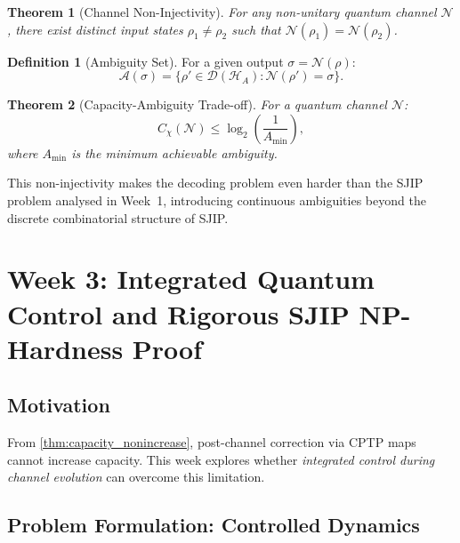 \documentclass[12pt,a4paper]{article}
\theoremstyle{definition}
\newtheorem{definition}{Definition}[section]
\theoremstyle{plain}
\newtheorem{theorem}{Theorem}[section]
\begin{document}
\begin{theorem}[Channel Non-Injectivity]
For any non-unitary quantum channel $\mathcal{N}$, there exist distinct input states
$\rho_1\ne\rho_2$ such that $\mathcal{N}(\rho_1)=\mathcal{N}(\rho_2)$.
\end{theorem}

\begin{definition}[Ambiguity Set]
For a given output $\sigma=\mathcal{N}(\rho)$:
\begin{equation}
\mathcal{A}(\sigma)=\{\rho'\in\mathcal{D}(\mathcal{H}_A):\mathcal{N}(\rho')=\sigma\}.
\end{equation}
\end{definition}

\begin{theorem}[Capacity-Ambiguity Trade-off]
\label{thm:cap_ambiguity}
For a quantum channel $\mathcal{N}$:
\begin{equation}
C_\chi(\mathcal{N})\le\log_2\!\left(\frac{1}{A_{\min}}\right),
\end{equation}
where $A_{\min}$ is the minimum achievable ambiguity.
\end{theorem}

This non-injectivity makes the decoding problem even harder than the SJIP problem
analysed in Week~1, introducing continuous ambiguities beyond the discrete combinatorial
structure of SJIP.

\section{Week 3: Integrated Quantum Control and Rigorous SJIP NP-Hardness Proof}

\subsection{Motivation}

From \cref{thm:capacity_nonincrease}, post-channel correction via CPTP maps cannot
increase capacity. This week explores whether \emph{integrated control during channel
evolution} can overcome this limitation.

\subsection{Problem Formulation: Controlled Dynamics}
\label{sec:week3_problem}
\end{document}

